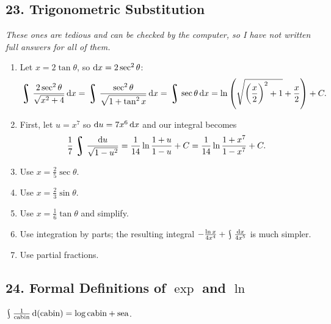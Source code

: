 \subsection*{23. Trigonometric Substitution}
\emph{These ones are tedious and can be checked by the computer, so I have not written full answers for all of them.}
\begin{enumerate}
  \item Let $ x = 2 \tan \theta $, so $ \dif{x} = 2\sec^2 \theta $:
        \begin{displaymath}
          \rint \frac{2\sec^2 \theta}{\sqrt{x^2 + 4}} \dif{x} = \rint \frac{\sec^2 \theta}{\sqrt{1 + \tan^2 x}} \dif{x} = \rint \sec \theta \dif{x}
            = \ln\left( \sqrt{\left(\frac{x}{2}\right)^2 + 1} + \frac{x}{2} \right) + C.
        \end{displaymath}
  \item First, let $ u = x^7 $ so $ \dif{u} = 7x^6 \dif{x} $ and our integral becomes
        \begin{displaymath}
          \frac{1}{7} \rint \frac{\dif{u}}{\sqrt{1 - u^2}} = \frac{1}{14} \ln \frac{1 + u}{1 - u} + C = \frac{1}{14} \ln \frac{1 + x^7}{1 - x^7} + C.
        \end{displaymath}
  \item Use $ x = \frac{2}{5} \sec \theta $.
  \item Use $ x = \frac{2}{3} \sin \theta $.
  \item Use $ x = \frac{1}{6} \tan \theta $ and simplify.
  \item Use integration by parts; the resulting integral $ - \frac{\ln x}{4x^4} + \rint \frac{\dif{x}}{4x^5} $ is much simpler.
  \item Use partial fractions.
\end{enumerate}

\subsection*{24. Formal Definitions of $ \exp $ and $ \ln $}
$ \rint \frac{1}{\text{cabin}} \dif{(\text{cabin})} = \log \text{cabin} + \text{sea} $.

